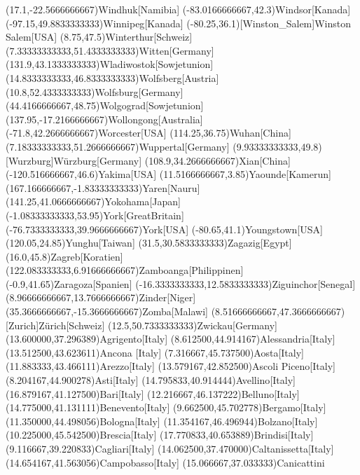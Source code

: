 \mapput(17.1,-22.5666666667){Windhuk}[Namibia]
\mapput(-83.0166666667,42.3){Windsor}[Kanada]
\mapput(-97.15,49.8833333333){Winnipeg}[Kanada]
\mapput(-80.25,36.1)[Winston_Salem]{Winston Salem}[USA]
\mapput(8.75,47.5){Winterthur}[Schweiz]
\mapput(7.33333333333,51.4333333333){Witten}[Germany]
\mapput(131.9,43.1333333333){Wladiwostok}[Sowjetunion]
\mapput(14.8333333333,46.8333333333){Wolfsberg}[Austria]
\mapput(10.8,52.4333333333){Wolfsburg}[Germany]
\mapput(44.4166666667,48.75){Wolgograd}[Sowjetunion]
\mapput(137.95,-17.2166666667){Wollongong}[Australia]
\mapput(-71.8,42.2666666667){Worcester}[USA]
\mapput(114.25,36.75){Wuhan}[China]
\mapput(7.18333333333,51.2666666667){Wuppertal}[Germany]
\mapput(9.93333333333,49.8)[Wurzburg]{Würzburg}[Germany]
\mapput(108.9,34.2666666667){Xian}[China]
\mapput(-120.516666667,46.6){Yakima}[USA]
\mapput(11.5166666667,3.85){Yaounde}[Kamerun]
\mapput(167.166666667,-1.83333333333){Yaren}[Nauru]
\mapput(141.25,41.0666666667){Yokohama}[Japan]
\mapput(-1.08333333333,53.95){York}[GreatBritain]
\mapput(-76.7333333333,39.9666666667){York}[USA]
\mapput(-80.65,41.1){Youngstown}[USA]
\mapput(120.05,24.85){Yunghu}[Taiwan]
\mapput(31.5,30.5833333333){Zagazig}[Egypt]
\mapput(16.0,45.8){Zagreb}[Koratien]
\mapput(122.083333333,6.91666666667){Zamboanga}[Philippinen]
\mapput(-0.9,41.65){Zaragoza}[Spanien]
\mapput(-16.3333333333,12.5833333333){Ziguinchor}[Senegal]
\mapput(8.96666666667,13.7666666667){Zinder}[Niger]
\mapput(35.3666666667,-15.3666666667){Zomba}[Malawi]
\mapput(8.51666666667,47.3666666667)[Zurich]{Zürich}[Schweiz]
\mapput(12.5,50.7333333333){Zwickau}[Germany]
\mapput[90](13.600000,37.296389){Agrigento}[Italy]
\mapput[0](8.612500,44.914167){Alessandria}[Italy]
\mapput[90](13.512500,43.623611){Ancona }[Italy]
\mapput[90](7.316667,45.737500){Aosta}[Italy]
\mapput[90](11.883333,43.466111){Arezzo}[Italy]
\mapput[90](13.579167,42.852500){Ascoli Piceno}[Italy]
\mapput[90](8.204167,44.900278){Asti}[Italy]
\mapput[90](14.795833,40.914444){Avellino}[Italy]
\mapput[90](16.879167,41.127500){Bari}[Italy]
\mapput[90](12.216667,46.137222){Belluno}[Italy]
\mapput[90](14.775000,41.131111){Benevento}[Italy]
\mapput[70](9.662500,45.702778){Bergamo}[Italy]
\mapput[-90](11.350000,44.498056){Bologna}[Italy]
\mapput[90](11.354167,46.496944){Bolzano}[Italy]
\mapput[90](10.225000,45.542500){Brescia}[Italy]
\mapput[90](17.770833,40.653889){Brindisi}[Italy]
\mapput[90](9.116667,39.220833){Cagliari}[Italy]
\mapput[90](14.062500,37.470000){Caltanissetta}[Italy]
\mapput[90](14.654167,41.563056){Campobasso}[Italy]
\mapput[-180](15.066667,37.033333){Canicattini}%
